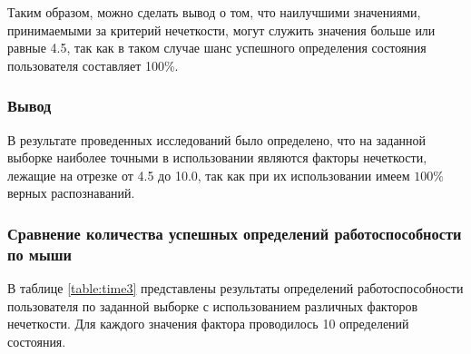 Таким образом, можно сделать вывод о том, что наилучшими значениями, принимаемыми за критерий нечеткости, могут служить значения больше или равные 4.5, так как в таком случае шанс успешного определения состояния пользователя составляет 100\%.

\subsubsection*{Вывод}

В результате проведенных исследований было определено, что на заданной выборке наиболее точными в использовании являются факторы нечеткости, лежащие на отрезке от 4.5 до 10.0, так как при их использовании имеем $100\%$ верных распознаваний.

\subsubsection{Сравнение количества успешных определений работоспособности по мыши}

В таблице \ref{table:time3} представлены результаты определений работоспособности пользователя по заданной выборке с использованием различных факторов нечеткости. Для каждого значения фактора проводилось 10 определений состояния.

